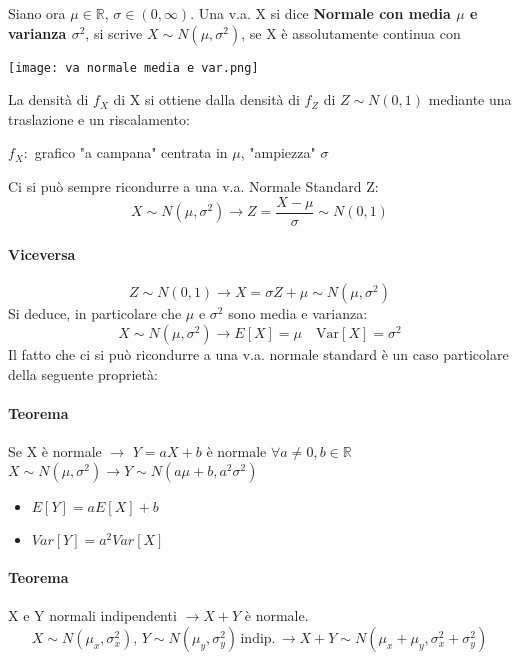 	Siano ora $\mu \in \mathbb{R}$, $\sigma \in (0, \infty)$.
	Una v.a. X si dice \textbf{Normale con media $\mu$ e varianza $\sigma^2$}, si scrive
	\textbf{$X \sim N(\mu, \sigma^2)$}, se X è assolutamente continua con
	\begin{center}
		\texttt{[image: va normale media e var.png]}
	\end{center}
	La densità di $f_X$ di X si ottiene dalla densità di $f_Z$ di $Z \sim N(0,1)$
	mediante una traslazione e un riscalamento:
	\begin{center}
		$f_X:$ grafico "a campana" centrata in $\mu$, "ampiezza" $\sigma$
	\end{center}
	Ci si può sempre ricondurre a una v.a. Normale Standard Z:
	\begin{equation*}
		X \sim N(\mu, \sigma^2) \rightarrow Z = \frac{X-\mu}{\sigma} \sim N(0,1)
	\end{equation*}
	\paragraph*{Viceversa}
	\begin{equation*}
		Z \sim N(0,1) \rightarrow X = \sigma Z + \mu \sim N(\mu, \sigma^2)
	\end{equation*}
	Si deduce, in particolare che $\mu$ e $\sigma^2$ sono media e varianza:
	\begin{equation*}
		X \sim N(\mu, \sigma^2) \rightarrow E[X] = \mu \quad \text{Var}[X] = \sigma^2
	\end{equation*}
	Il fatto che ci si può ricondurre a una v.a. normale standard è un caso particolare
	della seguente proprietà:
	\paragraph*{Teorema} Se X è normale $\rightarrow$ $Y = aX+b$ è normale
$\forall a \neq 0, b \in \mathbb{R}$
	\\ $ X \sim N(\mu, \sigma^2) \rightarrow Y \sim N(a \mu+b, a^2 \sigma^2)$
	\begin{itemize}
		\item $E[Y] = aE[X]+b$
		\item $Var[Y] = a^2 Var[X]$
	\end{itemize}
	\paragraph*{Teorema} X e Y normali indipendenti $\rightarrow X+Y$ è normale.
\begin{equation*}
	X \sim N(\mu_x, \sigma^{2}_x), \, Y \sim N(\mu_y, \sigma^{2}_y)\, \text{indip.}\,
	\rightarrow X+Y \sim N(\mu_x+\mu_y, \sigma^{2}_x + \sigma^{2}_y)
\end{equation*}
